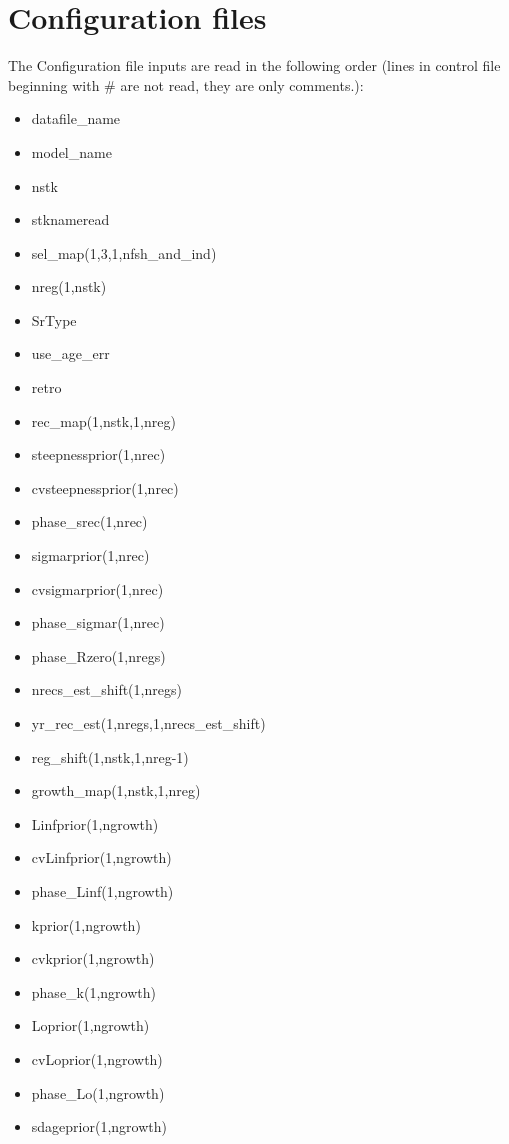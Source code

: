 \documentclass{article}
\begin{document}
\section{Configuration files}
The Configuration file inputs are read in the following order (lines  in control file beginning with \# are not read, they are only comments.):
\begin{itemize}
    \item datafile\_name
    \item model\_name
    \item nstk
    \item stknameread
    \item sel\_map(1,3,1,nfsh\_and\_ind)
    \item nreg(1,nstk)
    \item SrType 
    \item use\_age\_err
    \item retro 
    \item rec\_map(1,nstk,1,nreg)
    \item steepnessprior(1,nrec)
    \item cvsteepnessprior(1,nrec)
    \item phase\_srec(1,nrec)
    \item sigmarprior(1,nrec)
    \item cvsigmarprior(1,nrec)
    \item phase\_sigmar(1,nrec)
    \item phase\_Rzero(1,nregs)
    \item nrecs\_est\_shift(1,nregs)
    \item yr\_rec\_est(1,nregs,1,nrecs\_est\_shift)
    \item reg\_shift(1,nstk,1,nreg-1)
    \item growth\_map(1,nstk,1,nreg)
    \item Linfprior(1,ngrowth)
    \item cvLinfprior(1,ngrowth)
    \item phase\_Linf(1,ngrowth)
    \item kprior(1,ngrowth)
    \item  cvkprior(1,ngrowth)
    \item phase\_k(1,ngrowth)
    \item Loprior(1,ngrowth)
    \item cvLoprior(1,ngrowth)
    \item phase\_Lo(1,ngrowth)
    \item sdageprior(1,ngrowth)

\end{itemize}
\end{document}
